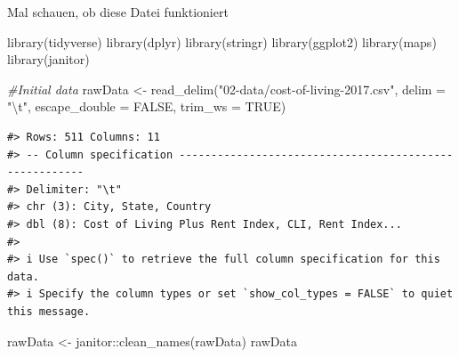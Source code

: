 \documentclass[
  11pt,
  a4paper,
  twoside]{scrbook}
\newenvironment{Shaded}{\begin{snugshade}}{\end{snugshade}}
\newcommand{\AttributeTok}[1]{\textcolor[rgb]{0.77,0.63,0.00}{#1}}
\newcommand{\CommentTok}[1]{\textcolor[rgb]{0.56,0.35,0.01}{\textit{#1}}}
\newcommand{\ConstantTok}[1]{\textcolor[rgb]{0.00,0.00,0.00}{#1}}
\newcommand{\FunctionTok}[1]{\textcolor[rgb]{0.00,0.00,0.00}{#1}}
\newcommand{\NormalTok}[1]{#1}
\newcommand{\OtherTok}[1]{\textcolor[rgb]{0.56,0.35,0.01}{#1}}
\newcommand{\SpecialCharTok}[1]{\textcolor[rgb]{0.00,0.00,0.00}{#1}}
\newcommand{\StringTok}[1]{\textcolor[rgb]{0.31,0.60,0.02}{#1}}
\begin{document}
Mal schauen, ob diese Datei funktioniert

\linespread{1}

\begin{Shaded}
\begin{Highlighting}[]

\FunctionTok{library}\NormalTok{(tidyverse)}
\FunctionTok{library}\NormalTok{(dplyr)}
\FunctionTok{library}\NormalTok{(stringr)}
\FunctionTok{library}\NormalTok{(ggplot2)}
\FunctionTok{library}\NormalTok{(maps)}
\FunctionTok{library}\NormalTok{(janitor)}

\CommentTok{\#Initial data}
\NormalTok{rawData }\OtherTok{\textless{}{-}} \FunctionTok{read\_delim}\NormalTok{(}\StringTok{"02{-}data/cost{-}of{-}living{-}2017.csv"}\NormalTok{, }
                                  \AttributeTok{delim =} \StringTok{"}\SpecialCharTok{\textbackslash{}t}\StringTok{"}\NormalTok{, }\AttributeTok{escape\_double =} \ConstantTok{FALSE}\NormalTok{, }
                                  \AttributeTok{trim\_ws =} \ConstantTok{TRUE}\NormalTok{)}
\end{Highlighting}
\end{Shaded}

\linespread{1}

\begin{verbatim}
#> Rows: 511 Columns: 11
#> -- Column specification -------------------------------------------------------
#> Delimiter: "\t"
#> chr (3): City, State, Country
#> dbl (8): Cost of Living Plus Rent Index, CLI, Rent Index...
#> 
#> i Use `spec()` to retrieve the full column specification for this data.
#> i Specify the column types or set `show_col_types = FALSE` to quiet this message.
\end{verbatim}

\linespread{1}

\begin{Shaded}
\begin{Highlighting}[]
\NormalTok{rawData }\OtherTok{\textless{}{-}}\NormalTok{ janitor}\SpecialCharTok{::}\FunctionTok{clean\_names}\NormalTok{(rawData)}
\NormalTok{rawData}
\end{Highlighting}
\end{Shaded}

\linespread{1}
\end{document}

